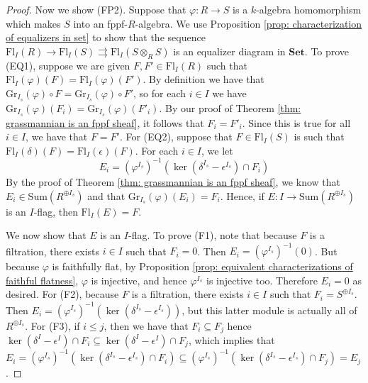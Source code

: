 \documentclass[oneside,11pt]{amsart}
\newcommand{\bSet}{\ensuremath{\textbf{Set}}}
\newcommand{\Sum}{\ensuremath{\text{Sum}}}
\newcommand{\Fl}{\ensuremath{\text{Fl}}}
\newcommand{\Gr}{\ensuremath{\text{Gr}}}
\theoremstyle{definition}
\newtheorem{proof techniques}{Proof Techniques}
\begin{document}
\begin{proof}
Now we show (FP2). Suppose that $\varphi: R \to S$ is a $k$-algebra homomorphism which makes $S$ into an fppf-$R$-algebra. We use Proposition \ref{prop: characterization of equalizers in set} to show that the sequence $\Fl_I(R) \to \Fl_I(S) \rightrightarrows \Fl_I(S \otimes_R S)$ is an equalizer diagram in $\bSet$. To prove (EQ1), suppose we are given $F , F' \in \Fl_I(R)$ such that $\Fl_I(\varphi)(F) = \Fl_I(\varphi)(F')$. By definition we have that $\Gr_{I_s}(\varphi) \circ F = \Gr_{I_s}(\varphi) \circ F'$, so for each $i \in I$ we have $\Gr_{I_s}(\varphi) (F_i ) = \Gr_{I_s}(\varphi) ( F'_i )$. By our proof of Theorem \ref{thm: grassmannian is an fppf sheaf}, it follows that $F_i = F'_i$. Since this is true for all $i \in I$, we have that $F = F'$. For (EQ2), suppose that $F \in \Fl_I(S)$ is such that $\Fl_I(\delta)(F) = \Fl_I(\epsilon)(F)$. For each $i \in I$, we let 
\begin{equation*}
E_i = (\varphi^{I_s})^{-1}( \ker( \delta^{I_s} - \epsilon^{I_s} ) \cap F_i )
\end{equation*}
By the proof of Theorem \ref{thm: grassmannian is an fppf sheaf}, we know that $E_i \in \Sum(R^{\oplus I_s})$ and that $\Gr_{I_s}(\varphi)(E_i)  = F_i$. Hence, if $E : I \to \Sum(R^{\oplus I_s})$ is an $I$-flag, then $\Fl_I(E) = F$. 

We now show that $E$ is an $I$-flag. To prove (F1), note that because $F$ is a filtration, there exists $i \in I$ such that $F_i = 0$. Then $E_i = (\varphi^{I_s})^{-1}(0)$. But because $\varphi$ is faithfully flat, by Proposition \ref{prop: equivalent characterizations of faithful flatness}, $\varphi$ is injective, and hence $\varphi^{I_s}$ is injective too. Therefore $E_i = 0$ as desired. For (F2), because $F$ is a filtration, there exists $i \in I$ such that $F_i = S^{\oplus I_s}$. Then $E_i = (\varphi^{I_s})^{-1}( \ker( \delta^{I_s} - \epsilon^{I_s} ))$, but this latter module is actually all of $R^{\oplus I_s}$. For (F3), if $i \leq j$, then we have that $F_i  \subseteq F_j$ hence $\ker( \delta^I - \epsilon^I ) \cap F_i \subseteq \ker( \delta^I - \epsilon^I ) \cap F_j$, which implies that $E_i = (\varphi^{I_s})^{-1}( \ker( \delta^{I_s} - \epsilon^{I_s} ) \cap F_i ) \subseteq (\varphi^{I_s})^{-1}( \ker( \delta^{I_s} - \epsilon^{I_s} ) \cap F_j ) = E_j$. 


\end{proof}
\end{document}
